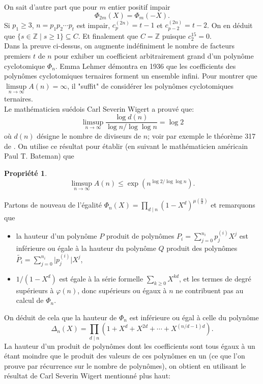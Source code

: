 \documentclass{article}
\theoremstyle{break}                  %
\newtheorem{propriete}{Propriété}
\begin{document}
On sait d'autre part que pour $m$ entier positif impair
$$\Phi_{2m}(X) = \Phi_m(-X).$$
Si $p_1 \ge 3$, $n = p_1 p_2 \cdots p_t$ est impair, $c_p^{(2n)}=t-1$ et $c_{p-2}^{(2n)}=t-2$. On en déduit que $\{s \in \mathbb Z \mid s \ge 1\} \subseteq C$. Et finalement que $C = \mathbb Z$ puisque $c_2^{15} = 0$.\\

Dans la preuve ci-dessus, on augmente indéfiniment le nombre de facteurs premiers $t$ de $n$ pour exhiber un coefficient arbitrairement grand d'un polynôme cyclotomique $\Phi_n$. Emma Lehmer démontra en 1936 \cite{infini} que les coefficients des polynômes cyclotomiques ternaires forment un ensemble infini. Pour montrer que $\limsup\limits_{n \to \infty} A(n) = \infty$, il "suffit" de considérer les polynômes cyclotomiques ternaires.\\

Le mathématicien suédois Carl Severin Wigert a prouvé que:
$$\limsup\limits_{n \to \infty} \frac{\log d(n)}{\log n / \log \log n} = \log 2$$ où $d(n)$ désigne le nombre de diviseurs de $n$; voir par exemple le théorème 317 de  \cite{numbers}. On utilise ce résultat pour établir (en suivant le mathématicien américain Paul T. Bateman) que

\begin{propriete}
	$$\limsup\limits_{n \to \infty} A(n) \le \exp(n^{\log 2 / \log \log n}).$$
\end{propriete}

Partons de nouveau de l'égalité $\Phi_n(X) = \prod_{d \mid n} (1-X^d)^{\mu(\frac{n}{d})}$ et remarquons que
\begin{itemize}
	\item la hauteur d'un polynôme $P$ produit de polynômes $P_i = \sum_{j=0}^{n_i} p_j^{(i)} X^j$ est inférieure ou égale à la hauteur du polynôme $Q$ produit des polynômes $\widetilde{P_i} = \sum_{j=0}^{n_i} \lvert p_j^{(i)} \rvert X^j$,
	\item $1/(1-X^d)$ est égale à la série formelle $\sum_{k \ge 0} X^{kd}$, et les termes de degré supérieurs à $\varphi(n)$, donc supérieurs ou égaux à $n$ ne contribuent pas au calcul de $\Phi_n$.\\
\end{itemize}
On déduit de cela que la hauteur de $\Phi_n$ est inférieure ou égal à celle du polynôme
$$\Delta_n(X) = \prod_{d \mid n} (1 + X^d + X^{2d} + \cdots + X^{(n/d - 1)d}).$$
La hauteur d'un produit de polynômes dont les coefficients sont tous égaux à un étant moindre que le produit des valeurs de ces polynômes en un (ce que l'on prouve par récurrence sur le nombre de polynômes), on obtient en utilisant le résultat de Carl Severin Wigert mentionné plus haut:
\end{document}
